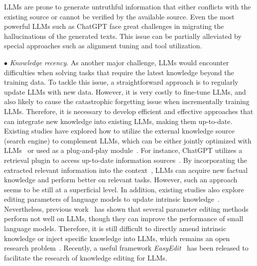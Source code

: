 \begin{center}
\begin{tcolorbox}[colback=blue!5!white,colframe=blue!55!black,width=0.46\textwidth,title={Hallucination}]
LLMs are prone to generate untruthful information that either conflicts with the existing source or cannot be verified by the available source. Even the most powerful LLMs such as ChatGPT face great challenges in migrating the hallucinations of the generated texts.  
This issue can be partially alleviated by special approaches such as alignment tuning and  tool utilization. 
\end{tcolorbox}
\end{center}

$\bullet$ \emph{Knowledge recency}. %
{As another major challenge, LLMs would encounter difficulties when solving tasks that require the latest knowledge beyond the training data.  %
To tackle this issue, a straightforward approach is to regularly update LLMs with new data.  
However, it is very costly to fine-tune LLMs, and also likely to cause the catastrophic forgetting issue when incrementally training LLMs. 
Therefore, it is necessary to develop efficient and effective approaches that can integrate new knowledge into existing LLMs, making them up-to-date.
Existing studies have explored how to utilize the external knowledge source (\eg search engine) to complement LLMs, which can be either jointly optimized with LLMs~\cite{Izacard-arxiv-2022-Few} or used as a plug-and-play module~\cite{Peng-arxiv-2023-Check}. For instance, ChatGPT utilizes a retrieval plugin to access up-to-date information sources~\cite{OpenAI-blog-2023-plugins}.
By incorporating the extracted relevant information into the context~\cite{Lazaridou-arxiv-2022-Internet,Qian-2023-arxiv-WebBrain,Liu-2023-arxiv-RETA-LLM}, LLMs can acquire new factual knowledge and perform better on relevant tasks.
However, such an approach seems to be still at a superficial level. In addition, 
{existing studies also explore editing parameters of language models to update intrinsic knowledge~\cite{Dai-ACL-2022-Knowledge,Meng-NIPS-2022-Locating,Geva-2021-emnlp-Transformer}.
Nevertheless, previous work~\cite{Yao-arxiv-2023-Editing} has shown that several parameter editing methods   perform not well on LLMs, though they can improve the performance of small language models.
Therefore, it is still difficult to directly amend intrinsic knowledge or inject specific knowledge into LLMs, which remains {an open research problem~\cite{Yao-arxiv-2023-Editing}}.
Recently, a useful framework \emph{EasyEdit}~\cite{wang-CoRR-2023-EasyEdit} has been released to facilitate the research of knowledge editing for LLMs. 
}%
}

